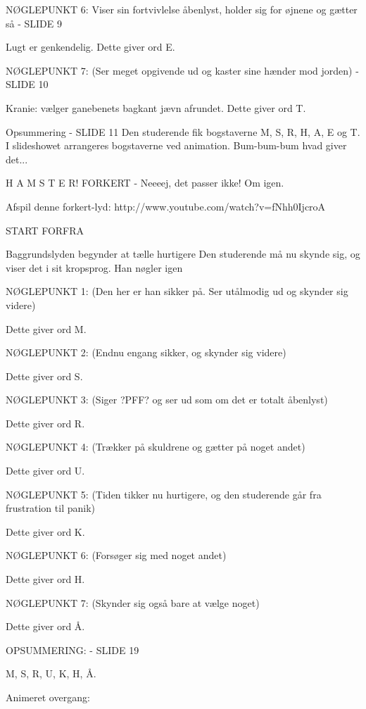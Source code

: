 \documentclass[a4paper,12pt]{article}
\begin{document}
\begin{sketch}
NØGLEPUNKT 6: 
\scene Viser sin fortvivlelse åbenlyst, holder sig for øjnene og gætter så - SLIDE 9

\scene Lugt er genkendelig. Dette giver ord E.

NØGLEPUNKT 7: (Ser meget opgivende ud og kaster sine hænder mod jorden) - SLIDE 10

\scene Kranie: vælger ganebenets bagkant jævn afrundet. Dette giver ord T.


Opsummering - SLIDE 11
\scene Den studerende fik bogstaverne M, S, R, H, A, E og T. I slideshowet arrangeres bogstaverne ved animation. Bum-bum-bum hvad giver det... 

H A M S T E R!
FORKERT - Neeeej, det passer ikke! Om igen.

Afspil denne forkert-lyd: http://www.youtube.com/watch?v=fNhh0IjcroA

START FORFRA

 Baggrundslyden begynder at tælle hurtigere
\scene Den studerende må nu skynde sig, og viser det i sit kropsprog. Han nøgler igen 

NØGLEPUNKT 1: \scene (Den her er han sikker på. Ser utålmodig ud og skynder sig videre)

\scene Dette giver ord M.

NØGLEPUNKT 2: \scene (Endnu engang sikker, og skynder sig videre)

Dette giver ord S.

NØGLEPUNKT 3: \scene (Siger ?PFF? og ser ud som om det er totalt åbenlyst)

Dette giver ord R.

NØGLEPUNKT 4: \scene (Trækker på skuldrene og gætter på noget andet)

Dette giver ord U.

NØGLEPUNKT 5: \scene (Tiden tikker nu hurtigere, og den studerende går fra frustration til panik)

Dette giver ord K.

NØGLEPUNKT 6: \scene (Forsøger sig med noget andet)

Dette giver ord H.

NØGLEPUNKT 7: \scene (Skynder sig også bare at vælge noget)

Dette giver ord Å.

OPSUMMERING: - SLIDE 19

M, S, R, U, K, H, Å.

Animeret overgang:


\end{sketch}
\end{document}
